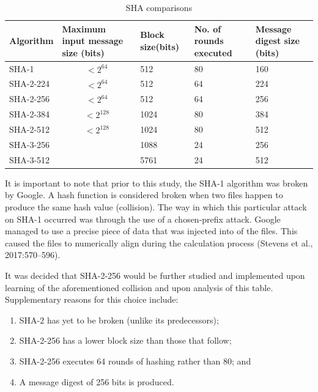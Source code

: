     
    \begin{table}[h!]
    \caption{SHA comparisons}
    \centering
     \begin{tabular}{|p{} | p{}| p{}| p{}| p{}|} 
     \hline
    	\textbf{Algorithm} & \textbf{Maximum input message size (bits)} & \textbf{Block size(bits)} & \textbf{No. of rounds executed} & \textbf{Message digest size (bits)} \\ [1ex] 
     \hline\hline
     SHA-1 & \[ <2^{64}\] & 512 & 80 & 160 \\[1ex]
     \hline
     SHA-2-224 & \[ <2^{64}\] & 512 & 64 & 224 \\[1ex]
     \hline
     SHA-2-256 & \[ <2^{64}\] & 512 & 64 & 256 \\[1ex]
     \hline           
     SHA-2-384 & \[ <2^{128}\] & 1024 & 80 & 384 \\[1ex]
     \hline      
     SHA-2-512 & \[ <2^{128}\] & 1024 & 80 & 512 \\[1ex]
     \hline
     SHA-3-256 & \centering{Unlimited} & 1088 & 24 & 256 \\[1ex] 
     \hline
     SHA-3-512 & \centering{Unlimited} & 5761 & 24 & 512 \\[1ex]
     \hline
     \end{tabular}
     \label{table: SHA comparisons}
    \end{table}
    
    It is important to note that prior to this study, the SHA-1 algorithm was broken by Google. A hash function is considered broken when two files happen to produce the same hash value (collision). The way in which this particular attack on SHA-1 occurred was through the use of a chosen-prefix attack. Google managed to use a precise piece of data that was injected into of the files. This caused the files to numerically align during the calculation process (Stevens et al., 2017:570–596).
    
    It was decided that SHA-2-256 would be further studied and implemented upon learning of the aforementioned collision and upon analysis of this table. Supplementary reasons for this choice include:
    
        \begin{enumerate}[label=\roman*.]
            
            \item SHA-2 has yet to be broken (unlike its predecessors);
            \item SHA-2-256 has a lower block size than those that follow; \item SHA-2-256 executes 64 rounds of hashing rather than 80; and
            \item A message digest of 256 bits is produced.

        \end{enumerate}
    
